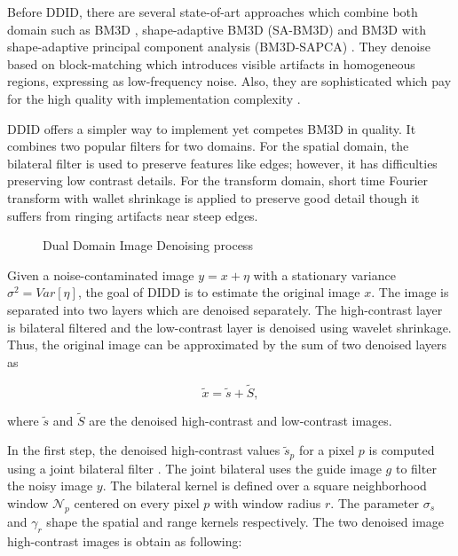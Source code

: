Before DDID, there are several state-of-art approaches which combine both domain such as BM3D \cite{Dabov2008}, shape-adaptive BM3D (SA-BM3D) \cite{Dabov2008_1} and BM3D with shape-adaptive principal component analysis (BM3D-SAPCA) \cite{Dabov2009}. They denoise based on block-matching which introduces visible artifacts in homogeneous regions, expressing as low-frequency noise. Also, they are sophisticated which pay for the high quality with implementation complexity \cite{Lebrun2012}.   

DDID offers a simpler way to implement yet competes BM3D in quality. It combines two popular filters for two domains. For the spatial domain, the bilateral filter is used to preserve features like edges; however, it has difficulties preserving low contrast details. For the transform domain, short time Fourier transform \cite{Allen1977} with wallet shrinkage \cite{Donoho1995, Zong1996, Taswell2000, fodor2003denoising} is applied to preserve good detail though it suffers from ringing artifacts near steep edges.

\begin{figure}[ht]
	\caption{Dual Domain Image Denoising process}
	\label{fig:ddid_process}
\end{figure}

Given a noise-contaminated image $y = x + \eta$ with a stationary variance $\sigma^2=Var[\eta]$, the goal of DIDD is to estimate the original image $x$. The image is separated into two layers which are denoised separately. The high-contrast layer is bilateral filtered and the low-contrast layer is denoised using wavelet shrinkage. Thus, the original image can be approximated by the sum of two denoised layers as

\begin{equation}
\label{eq:did_ss}
\tilde{x} = \tilde{s} + \tilde{S},
\end{equation}

where $\tilde{s}$ and $\tilde{S}$ are the denoised high-contrast and low-contrast images.

In the first step, the denoised high-contrast values $\tilde{s}_{p}$ for a pixel $p$ is computed using a joint bilateral filter \cite{Paris2008}. The joint bilateral uses the guide image $g$ to filter the noisy image $y$. The bilateral kernel is defined over a square neighborhood window $\mathbf{\mathscr{N}}_{p}$ centered on every pixel $p$ with window radius $r$. The parameter $\sigma_{s}$ and $\gamma_{r}$ shape the spatial and range kernels respectively. The two denoised image high-contrast images is obtain as following:

